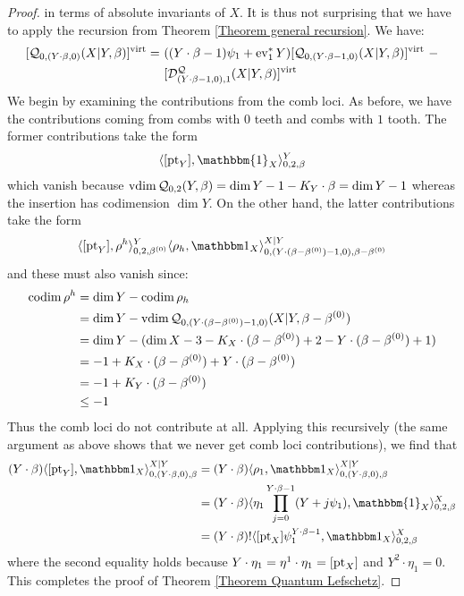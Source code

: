 \begin{proof}
in terms of absolute invariants of $X$. It is thus not surprising that we have to apply the recursion from Theorem \ref{Theorem general recursion}. We have:
\begin{align*} [\mathcal{Q}_{0,(Y \cdot \beta,0)}(X|Y,\beta)]^{\operatorname{virt}} = \ & ((Y\cdot\beta-1)\psi_1+\operatorname{ev}_1^*Y) [\mathcal{Q}_{0,(Y\cdot\beta-1,0)}(X|Y,\beta)]^{\operatorname{virt}} \ - \\
& [\mathcal{D}_{(Y\cdot\beta-1,0),1}^{\mathcal Q}(X|Y,\beta)]^{\operatorname{virt}} \end{align*}
We begin by examining the contributions from the comb loci. As before, we have the contributions coming from combs with $0$ teeth and combs with $1$ tooth. The former contributions take the form
\begin{equation*} \langle [\pt_Y] , \mathbbm{1}_X \rangle_{0,2,\beta}^Y \end{equation*}
which vanish because $\operatorname{vdim}{\mathcal{Q}_{0,2}(Y,\beta)} = \dim Y -1 -K_Y\cdot\beta = \dim Y -1$ whereas the insertion has codimension $\dim Y$. On the other hand, the latter contributions take the form
\begin{equation*} \langle [\pt_Y],\rho^h\rangle_{0,2,\beta^{(0)}}^Y \langle \rho_h,\mathbbm 1_{X}\rangle_{0,(Y\cdot(\beta-\beta^{(0)})-1,0),\beta-\beta^{(0)}}^{X|Y}\end{equation*}
and these must also vanish since:
\begin{align*} \operatorname{codim} \rho^h & = \dim Y - \operatorname{codim} \rho_h \\
& = \dim Y - \operatorname{vdim} \mathcal{Q}_{0,(Y\cdot(\beta-\beta^{(0)})-1,0)}(X|Y,\beta-\beta^{(0)}) \\
& = \dim Y - (\dim X - 3 - K_X \cdot (\beta - \beta^{(0)}) + 2 - Y \cdot (\beta - \beta^{(0)}) + 1) \\
&= -1 + K_X \cdot (\beta-\beta^{(0)}) + Y \cdot (\beta-\beta^{(0)}) \\
& = -1 + K_Y\cdot(\beta-\beta^{(0)}) \\
& \leq -1
\end{align*}
Thus the comb loci do not contribute at all. Applying this recursively (the same argument as above shows that we never get comb loci contributions), we find that
\begin{align*}
(Y\cdot\beta)\langle [\pt_Y],\mathbbm 1_{X}\rangle_{0,(Y\cdot\beta,0),\beta}^{X|Y} & = (Y\cdot\beta)\langle \rho_1 ,\mathbbm 1_{X}\rangle_{0,(Y\cdot\beta,0),\beta}^{X|Y} \\
& = (Y\cdot\beta) \langle \eta_1 \prod_{j=0}^{Y\cdot\beta-1}(Y+j\psi_1) , \mathbbm{1}_X \rangle_{0,2,\beta}^X \\
& = (Y\cdot\beta)!\langle[ \pt_X]\psi_1^{Y\cdot\beta-1},\mathbbm 1_X\rangle_{0,2,\beta}^X
\end{align*}
where the second equality holds because $Y\cdot\eta_1=\eta^1 \cdot \eta_1 = [\operatorname{pt}_X]$ and $Y^2\cdot\eta_1=0$. This completes the proof of Theorem \ref{Theorem Quantum Lefschetz}. \end{proof}

